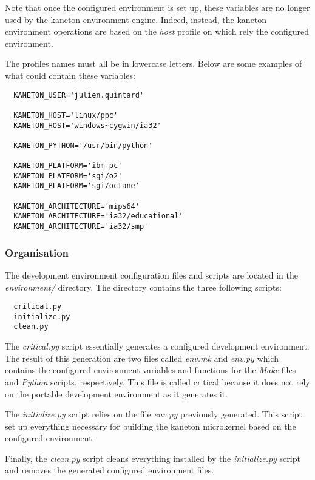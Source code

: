 Note that once the configured environment is set up, these variables are
no longer used by the kaneton environment engine. Indeed, instead, the
kaneton environment operations are based on the \textit{host} profile on
which rely the configured environment.

The profiles names must all be in lowercase letters. Below are some examples
of what could contain these variables:

\begin{verbatim}
  KANETON_USER='julien.quintard'

  KANETON_HOST='linux/ppc'
  KANETON_HOST='windows~cygwin/ia32'

  KANETON_PYTHON='/usr/bin/python'

  KANETON_PLATFORM='ibm-pc'
  KANETON_PLATFORM='sgi/o2'
  KANETON_PLATFORM='sgi/octane'

  KANETON_ARCHITECTURE='mips64'
  KANETON_ARCHITECTURE='ia32/educational'
  KANETON_ARCHITECTURE='ia32/smp'
\end{verbatim}

%
%

\subsubsection{Organisation}

The development environment configuration files and scripts are located in
the \textit{environment/} directory. The directory contains the three
following scripts:

\begin{verbatim}
  critical.py
  initialize.py
  clean.py
\end{verbatim}

The \textit{critical.py} script essentially generates a configured development
environment. The result of this generation are two files called
\textit{env.mk} and \textit{env.py} which contains the configured environment
variables and functions for the \textit{Make} files and \textit{Python}
scripts, respectively. This file is called critical because it does not rely
on the portable development environment as it generates it.

The \textit{initialize.py} script relies on the file \textit{env.py} previously
generated. This script set up everything necessary for building the
kaneton microkernel based on the configured environment.

Finally, the \textit{clean.py} script cleans everything installed by the
\textit{initialize.py} script and removes the generated configured environment
files.

